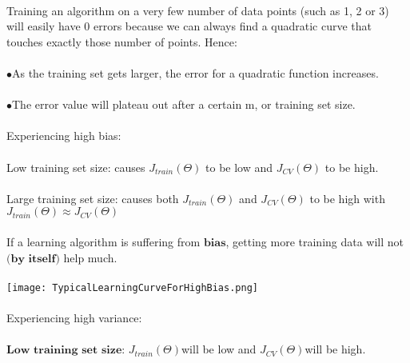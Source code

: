 \documentclass[UTF8]{ctexart}
\begin{document}
\paragraph{}
Training an algorithm on a very few number of data points (such as 1, 2 or 3) will easily have 0 errors because we can always find a quadratic curve that touches exactly those number of points. Hence:
\paragraph{}
$\bullet$As the training set gets larger, the error for a quadratic function increases.
\paragraph{}
$\bullet$The error value will plateau out after a certain m, or training set size.
\paragraph{}
Experiencing high bias:
\paragraph{}
Low training set size: causes $J_{train}(\Theta)$ to be low and $J_{CV}(\Theta)$ to be high.
\paragraph{}
Large training set size: causes both $J_{train}(\Theta)$ and $J_{CV}(\Theta)$ to be high with $J_{train}(\Theta) \approx J_{CV}(\Theta)$
\paragraph{}
If a learning algorithm is suffering from $\textbf{bias}$, getting more training data will not $\textbf{(by itself)}$ help much.
\paragraph{}
\texttt{[image: TypicalLearningCurveForHighBias.png]}
\paragraph{}
Experiencing high variance:
\paragraph{}
$\textbf{Low training set size:}$ $J_{train}(\Theta)$will be low and $J_{CV}(\Theta)$will be high.
\end{document}
